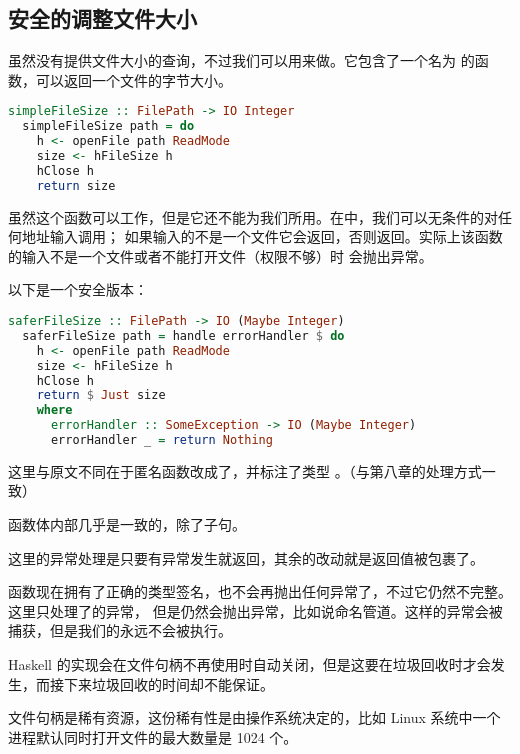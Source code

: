 \documentclass[./main.tex]{subfiles}
\begin{document}
\subsection*{安全的调整文件大小}

虽然没有提供文件大小的查询，不过我们可以用来做。它包含了一个名为
的函数，可以返回一个文件的字节大小。

\begin{lstlisting}[language=Haskell]
  simpleFileSize :: FilePath -> IO Integer
  simpleFileSize path = do
    h <- openFile path ReadMode
    size <- hFileSize h
    hClose h
    return size
\end{lstlisting}

虽然这个函数可以工作，但是它还不能为我们所用。在中，我们可以无条件的对任何地址输入调用；
如果输入的不是一个文件它会返回，否则返回。实际上该函数的输入不是一个文件或者不能打开文件（权限不够）时
会抛出异常。

以下是一个安全版本：

\begin{lstlisting}[language=Haskell]
  saferFileSize :: FilePath -> IO (Maybe Integer)
  saferFileSize path = handle errorHandler $ do
    h <- openFile path ReadMode
    size <- hFileSize h
    hClose h
    return $ Just size
    where
      errorHandler :: SomeException -> IO (Maybe Integer)
      errorHandler _ = return Nothing
\end{lstlisting}

这里与原文不同在于匿名函数改成了，并标注了类型
。（与第八章的处理方式一致）

函数体内部几乎是一致的，除了子句。

这里的异常处理是只要有异常发生就返回，其余的改动就是返回值被包裹了。

函数现在拥有了正确的类型签名，也不会再抛出任何异常了，不过它仍然不完整。这里只处理了的异常，
但是仍然会抛出异常，比如说命名管道。这样的异常会被捕获，但是我们的永远不会被执行。

Haskell 的实现会在文件句柄不再使用时自动关闭，但是这要在垃圾回收时才会发生，而接下来垃圾回收的时间却不能保证。

文件句柄是稀有资源，这份稀有性是由操作系统决定的，比如 Linux 系统中一个进程默认同时打开文件的最大数量是 1024 个。
\end{document}
